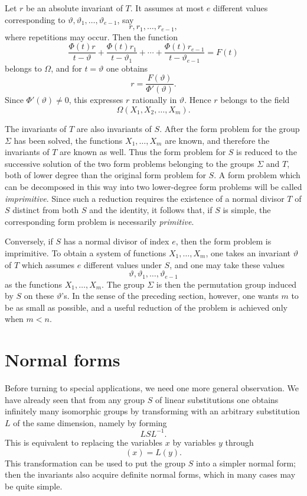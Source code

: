 \documentclass[11pt,a4paper]{book}
\begin{document}
Let $r$ be an absolute invariant of $T$.  It assumes at most $e$ different values corresponding to $\vartheta,\vartheta_1,\ldots,\vartheta_{e-1}$, say
\[
 r,r_1,\ldots,r_{e-1},
\]
where repetitions may occur.  Then the function
\[
 \frac{\Phi(t)r}{t-\vartheta}
 +\frac{\Phi(t)r_1}{t-\vartheta_1}
 +\cdots+
 \frac{\Phi(t)r_{e-1}}{t-\vartheta_{e-1}}
 =F(t)
\]
belongs to $\Omega$, and for $t=\vartheta$ one obtains
\[
 r=\frac{F(\vartheta)}{\Phi'(\vartheta)}.
\]
Since $\Phi'(\vartheta)\ne0$, this expresses $r$ rationally in $\vartheta$.  Hence $r$ belongs to the field
\[
 \Omega(X_1,X_2,\ldots,X_m).
\]

The invariants of $T$ are also invariants of $S$.  After the form problem for the group $\Sigma$ has been solved, the functions $X_1,\ldots,X_m$ are known, and therefore the invariants of $T$ are known as well.  Thus the form problem for $S$ is reduced to the successive solution of the two form problems belonging to the groups $\Sigma$ and $T$, both of lower degree than the original form problem for $S$.  A form problem which can be decomposed in this way into two lower-degree form problems will be called \emph{imprimitive}.  Since such a reduction requires the existence of a normal divisor $T$ of $S$ distinct from both $S$ and the identity, it follows that, if $S$ is simple, the corresponding form problem is necessarily \emph{primitive}.

Conversely, if $S$ has a normal divisor of index $e$, then the form problem is imprimitive.  To obtain a system of functions $X_1,\ldots,X_m$, one takes an invariant $\vartheta$ of $T$ which assumes $e$ different values under $S$, and one may take these values
\[
 \vartheta,\vartheta_1,\ldots,\vartheta_{e-1}
\]
as the functions $X_1,\ldots,X_m$.  The group $\Sigma$ is then the permutation group induced by $S$ on these $\vartheta$'s.  In the sense of the preceding section, however, one wants $m$ to be as small as possible, and a useful reduction of the problem is achieved only when $m<n$.

\section{Normal forms}

Before turning to special applications, we need one more general observation.  We have already seen that from any group $S$ of linear substitutions one obtains infinitely many isomorphic groups by transforming with an arbitrary substitution $L$ of the same dimension, namely by forming
\begin{equation}\label{eq:w9-normal-transform}
 LSL^{-1}.
\end{equation}
This is equivalent to replacing the variables $x$ by variables $y$ through
\begin{equation}\label{eq:w9-xLy}
 (x)=L(y).
\end{equation}
This transformation can be used to put the group $S$ into a simpler normal form; then the invariants also acquire definite normal forms, which in many cases may be quite simple.
\end{document}

